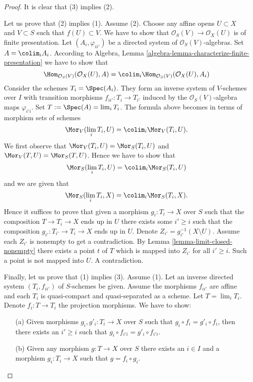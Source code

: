 \begin{proof}
It is clear that (3) implies (2).

\medskip\noindent
Let us prove that (2) implies (1). Assume (2).
Choose any affine opens $U \subset X$ and $V \subset S$ such that
$f(U) \subset V$. We have to show that
$\mathcal{O}_S(V) \to \mathcal{O}_X(U)$ is of finite presentation.
Let $(A_i, \varphi_{ii'})$ be a directed system of
$\mathcal{O}_S(V)$-algebras. Set $A = \colim_i A_i$.
According to
Algebra, Lemma \ref{algebra-lemma-characterize-finite-presentation}
we have to show that
$$
\Hom_{\mathcal{O}_S(V)}(\mathcal{O}_X(U), A) =
\colim_i \Hom_{\mathcal{O}_S(V)}(\mathcal{O}_X(U), A_i)
$$
Consider the schemes $T_i = \Spec(A_i)$. They
form an inverse system of $V$-schemes over $I$
with transition morphisms $f_{ii'} : T_i \to T_{i'}$
induced by the $\mathcal{O}_S(V)$-algebra maps $\varphi_{i'i}$.
Set $T := \Spec(A) = \lim_i T_i$.
The formula above becomes in terms of morphism sets of schemes
$$
\Mor_V(\lim_i T_i, U) =
\colim_i \Mor_V(T_i, U).
$$
We first observe that
$\Mor_V(T_i, U) = \Mor_S(T_i, U)$
and
$\Mor_V(T, U) = \Mor_S(T, U)$.
Hence we have to show that
$$
\Mor_S(\lim_i T_i, U) =
\colim_i \Mor_S(T_i, U)
$$
and we are given that
$$
\Mor_S(\lim_i T_i, X) =
\colim_i \Mor_S(T_i, X).
$$
Hence it suffices to prove that given a morphism $g_i : T_i \to X$ over $S$
such that the composition $T \to T_i \to X$ ends up in $U$ there exists some
$i' \geq i$ such that the composition $g_{i'} : T_{i'} \to T_i \to X$ ends up
in $U$. Denote $Z_{i'} = g_{i'}^{-1}(X \setminus U)$.
Assume each $Z_{i'}$ is nonempty
to get a contradiction. By Lemma \ref{lemma-limit-closed-nonempty}
there exists a point $t$ of $T$ which is mapped into $Z_{i'}$ for all
$i' \geq i$. Such a point is not mapped into $U$. A contradiction.

\medskip\noindent
Finally, let us prove that (1) implies (3). Assume (1). Let an inverse directed
system $(T_i, f_{ii'})$ of $S$-schemes be given. Assume the morphisms $f_{ii'}$
are affine and each $T_i$ is quasi-compact and quasi-separated as a scheme. Let
$T = \lim_i T_i$. Denote $f_i : T \to T_i$ the projection morphisms.
We have to show:
\begin{enumerate}
\item[(a)] Given morphisms $g_i, g'_i : T_i \to X$ over $S$ such that
$g_i \circ f_i = g'_i \circ f_i$, then there exists an $i' \geq i$
such that $g_i \circ f_{i'i} = g'_i \circ f_{i'i}$.
\item[(b)] Given any morphism
$g : T \to X$ over $S$ there exists an $i \in I$ and a morphism
$g_i : T_i \to X$ such that $g = f_i \circ g_i$.
\end{enumerate}


\end{proof}
